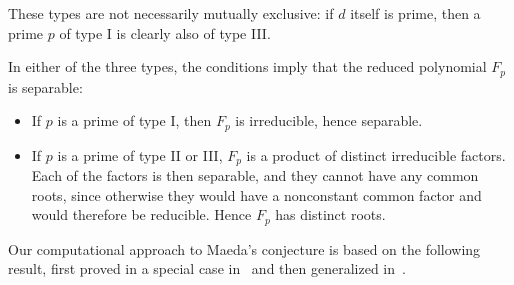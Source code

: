 \documentclass{book}
\begin{document}
\begin{remark}
These types are not necessarily mutually exclusive: if $d$ itself is
prime, then a prime $p$ of type I is clearly also of type III.
\end{remark}

\begin{remark}
In either of the three types, the conditions imply that the reduced polynomial
$F_p$ is separable:
\begin{itemize}
  \item If $p$ is a prime of type I, then $F_p$ is irreducible, hence
    separable.
  \item If $p$ is a prime of type II or III, $F_p$ is a product of distinct
    irreducible factors.  Each of the factors is then separable, and they 
    cannot have any common roots, since otherwise they would have a
    nonconstant common factor and would therefore be reducible.  Hence $F_p$
    has distinct roots.
\end{itemize}
\end{remark}

Our computational approach to Maeda's conjecture is based on the following
result, first proved in a special case in~\cite{Buzzard} and then generalized
in~\cite{ConreyFarmer}.
\end{document}
